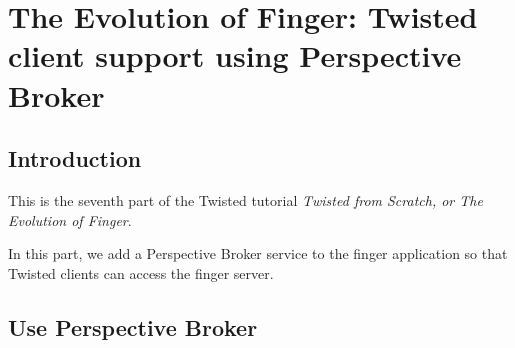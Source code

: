 \section{The Evolution of Finger: Twisted client support using Perspective Broker\label{doc/howto/tutorial/pb.xhtml}}


\subsection{Introduction}


 This is the seventh part of the Twisted tutorial \textit{Twisted from Scratch, or The Evolution of Finger}.

In this part, we add a Perspective Broker service to the finger application so that Twisted clients can access the finger server.

\subsection{Use Perspective Broker}



